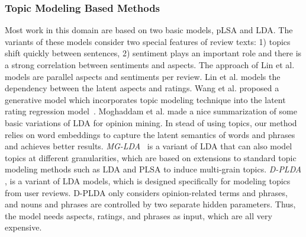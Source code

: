 \subsubsection{Topic Modeling Based Methods}
Most work in this domain are based on two basic models, 
pLSA\cite{hofmann1999probabilistic} and LDA\cite{Blei2003LatentDA}. 
The variants of these models consider two special features of review texts:
1) topics shift quickly between sentences,
2) sentiment plays an important role and there is a strong 
correlation between sentiments and aspects. 
The approach of Lin et al.  models are 
parallel aspects and sentiments per review. 
Lin et al.  models the dependency between 
the latent aspects and ratings. Wang et al.  proposed 
a generative model which incorporates topic modeling technique 
into the latent rating regression model~\cite{wang2010latent}.
Moghaddam et al.  made a nice 
summarization of some basic variations of LDA for opinion mining.
In stead of using topics, our method relies on word embeddings to capture
the latent semantics of words and phrases and achieves better results.
\emph{MG-LDA}~\cite{titov2008modeling} is a variant of LDA that can also model topics at different granularities, which are based on extensions to standard topic modeling methods such as LDA and PLSA to induce multi-grain topics. 
\emph{D-PLDA} \cite{moghaddam2012design}, 
is a variant of LDA models, which is designed specifically for modeling topics from user reviews.  
D-PLDA only considers opinion-related terms and phrases, 
and nouns and phrases are controlled by two separate hidden parameters. Thus, the model needs aspects, ratings, and phrases as input, which are all very expensive.


